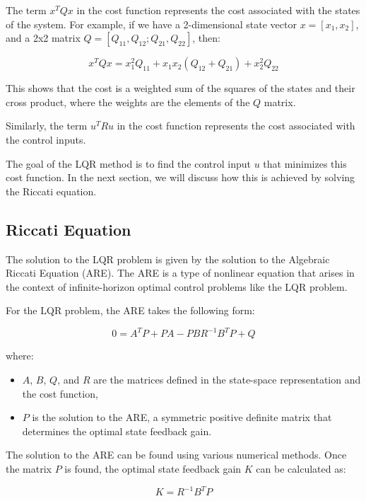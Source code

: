 \documentclass[11pt,twocolumn,twoside,lineno]{pnas-new}
\begin{document}
The term \(x^TQx\) in the cost function represents the cost associated with the states of the system. For example, if we have a 2-dimensional state vector \(x = [x_1, x_2]\), and a 2x2 matrix \(Q = [Q_{11}, Q_{12}; Q_{21}, Q_{22}]\), then:

\begin{equation}
x^TQx = x_1^2Q_{11} + x_1x_2(Q_{12} + Q_{21}) + x_2^2Q_{22}
\end{equation}

This shows that the cost is a weighted sum of the squares of the states and their cross product, where the weights are the elements of the \(Q\) matrix.

Similarly, the term \(u^TRu\) in the cost function represents the cost associated with the control inputs.

The goal of the LQR method is to find the control input \(u\) that minimizes this cost function. In the next section, we will discuss how this is achieved by solving the Riccati equation.


\subsection{Riccati Equation}
The solution to the LQR problem is given by the solution to the Algebraic Riccati Equation (ARE). The ARE is a type of nonlinear equation that arises in the context of infinite-horizon optimal control problems like the LQR problem.

For the LQR problem, the ARE takes the following form:

\begin{equation}
0 = A^TP + PA - PBR^{-1}B^TP + Q
\end{equation}

where:
\begin{itemize}
    \item \(A\), \(B\), \(Q\), and \(R\) are the matrices defined in the state-space representation and the cost function,
    \item \(P\) is the solution to the ARE, a symmetric positive definite matrix that determines the optimal state feedback gain.
\end{itemize}

The solution to the ARE can be found using various numerical methods. Once the matrix \(P\) is found, the optimal state feedback gain \(K\) can be calculated as:

\begin{equation}
K = R^{-1}B^TP
\end{equation}
\end{document}

